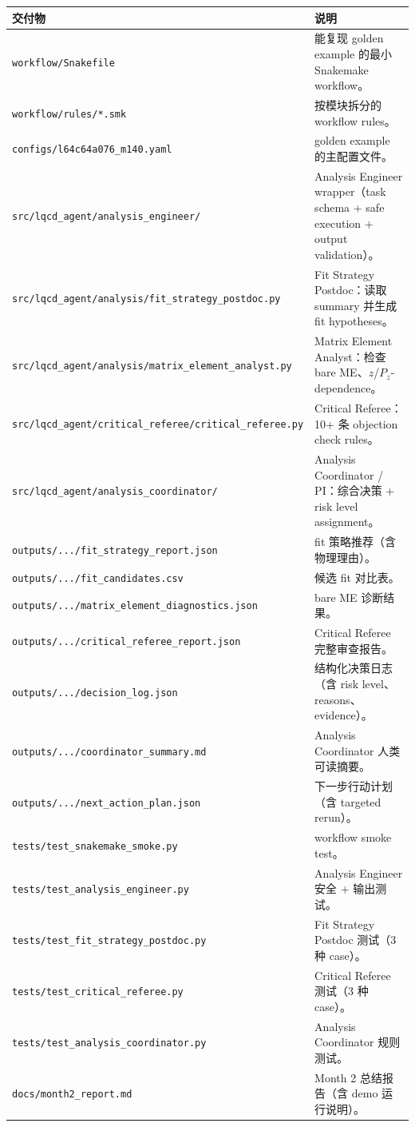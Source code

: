 \documentclass[11pt,a4paper,fontset=none]{ctexart}
\begin{document}
\begin{longtable}{p{}p{}}
\toprule
\textbf{交付物} & \textbf{说明} \\
\midrule
\texttt{workflow/Snakefile} & 能复现 golden example 的最小 Snakemake workflow。 \\
\texttt{workflow/rules/*.smk} & 按模块拆分的 workflow rules。 \\
\texttt{configs/l64c64a076\_m140.yaml} & golden example 的主配置文件。 \\
\texttt{src/lqcd\_agent/analysis\_engineer/} & Analysis Engineer wrapper（task schema + safe execution + output validation）。 \\
\texttt{src/lqcd\_agent/analysis/fit\_strategy\_postdoc.py} & Fit Strategy Postdoc：读取 summary 并生成 fit hypotheses。 \\
\texttt{src/lqcd\_agent/analysis/matrix\_element\_analyst.py} & Matrix Element Analyst：检查 bare ME、$z$/$P_z$-dependence。 \\
\texttt{src/lqcd\_agent/critical\_referee/critical\_referee.py} & Critical Referee：10+ 条 objection check rules。 \\
\texttt{src/lqcd\_agent/analysis\_coordinator/} & Analysis Coordinator / PI：综合决策 + risk level assignment。 \\
\texttt{outputs/.../fit\_strategy\_report.json} & fit 策略推荐（含物理理由）。 \\
\texttt{outputs/.../fit\_candidates.csv} & 候选 fit 对比表。 \\
\texttt{outputs/.../matrix\_element\_diagnostics.json} & bare ME 诊断结果。 \\
\texttt{outputs/.../critical\_referee\_report.json} & Critical Referee 完整审查报告。 \\
\texttt{outputs/.../decision\_log.json} & 结构化决策日志（含 risk level、reasons、evidence）。 \\
\texttt{outputs/.../coordinator\_summary.md} & Analysis Coordinator 人类可读摘要。 \\
\texttt{outputs/.../next\_action\_plan.json} & 下一步行动计划（含 targeted rerun）。 \\
\texttt{tests/test\_snakemake\_smoke.py} & workflow smoke test。 \\
\texttt{tests/test\_analysis\_engineer.py} & Analysis Engineer 安全 + 输出测试。 \\
\texttt{tests/test\_fit\_strategy\_postdoc.py} & Fit Strategy Postdoc 测试（3 种 case）。 \\
\texttt{tests/test\_critical\_referee.py} & Critical Referee 测试（3 种 case）。 \\
\texttt{tests/test\_analysis\_coordinator.py} & Analysis Coordinator 规则测试。 \\
\texttt{docs/month2\_report.md} & Month 2 总结报告（含 demo 运行说明）。 \\
\bottomrule
\end{longtable}
\end{document}
